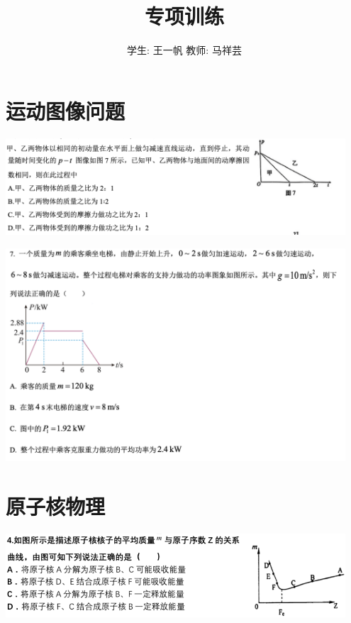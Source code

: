 \documentclass{article}
\title{专项训练}
\author{学生: 王一帆 \quad 教师: 马祥芸}
\begin{document}
\maketitle
\tableofcontents
{}
\newpage

\section{运动图像问题}
\includegraphics[width = 0.95\textwidth]{./pictures/1.png}

\vspace{5em}

\includegraphics[width = 0.95\textwidth]{./pictures/2.png}

\vspace{5em}

\section{原子核物理}
\includegraphics[width = 0.95\textwidth]{./pictures/3.png}

\vspace{5em}
\end{document}
